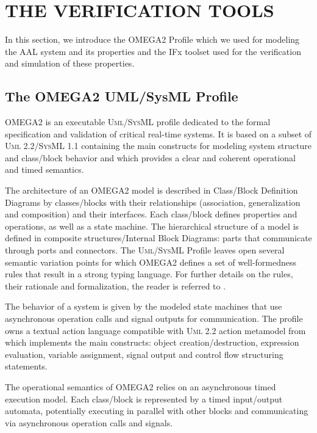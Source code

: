 \documentclass[a4paper,twoside]{article}
\def\sysml{\textsc{SysML}}
\def\uml{\textsc{Uml}}
\begin{document}
\section{\uppercase{The verification tools}}
\label{sec:tools}
\noindent In this section, we introduce the OMEGA2 Profile which we used for modeling the AAL system and its properties and the IFx toolset used for the verification and simulation of these properties. 

\subsection{The OMEGA2 UML/SysML Profile}

OMEGA2 is an executable \uml{}/\sysml{} profile dedicated to the formal specification and validation of critical real-time systems. It is based on a subset of \uml{} 2.2/\sysml{} 1.1 containing the main constructs for modeling system structure and class/block behavior and which provides a clear and coherent operational and timed semantics.

The architecture of an OMEGA2 model is described in Class/Block Definition Diagrams by classes/blocks with their relationships (association, generalization and composition) and their interfaces. Each class/block defines properties and operations, as well as a state machine. The hierarchical structure of a model is defined in composite structures/Internal Block Diagrams: parts that communicate through ports and connectors. The \uml{}/\sysml{} Profile leaves open several semantic variation points for which OMEGA2 defines a set of well-formedness rules that result in a strong typing language. For further details on the rules, their rationale and formalization, the reader is referred to \cite{IOber2011}.

The behavior of a system is given by the modeled state machines that use asynchronous operation calls and signal outputs for communication. The profile owns a textual action language compatible with \uml{} 2.2 action metamodel from which implements the main constructs: object creation/destruction, expression evaluation, variable assignment, signal output and control flow structuring statements.

The operational semantics of OMEGA2 relies on an asynchronous timed execution model. Each class/block is represented by a timed input/output automata, potentially executing in parallel with other blocks and communicating via asynchronous operation calls and signals. 
\end{document}
